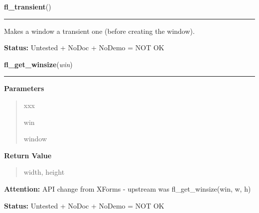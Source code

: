     \label{xformslib:library:fl_transient}

    \vspace{0.5ex}

\hspace{.8\funcindent}\begin{boxedminipage}{\funcwidth}

    \raggedright \textbf{fl\_transient}()

    \vspace{-1.5ex}

    \rule{\textwidth}{0.5\fboxrule}
\setlength{\parskip}{2ex}
    Makes a window a transient one (before creating the window).

\setlength{\parskip}{1ex}
\textbf{Status:} Untested + NoDoc + NoDemo = NOT OK



    \end{boxedminipage}

    \label{xformslib:library:fl_get_winsize}

    \vspace{0.5ex}

\hspace{.8\funcindent}\begin{boxedminipage}{\funcwidth}

    \raggedright \textbf{fl\_get\_winsize}(\textit{win})

    \vspace{-1.5ex}

    \rule{\textwidth}{0.5\fboxrule}
\setlength{\parskip}{2ex}
\setlength{\parskip}{1ex}
      \textbf{Parameters}
      \vspace{-1ex}

      \begin{quote}
        \begin{Ventry}{xxx}

          \item[win]

          window

        \end{Ventry}

      \end{quote}

      \textbf{Return Value}
    \vspace{-1ex}

      \begin{quote}
      width, height

      \end{quote}

\textbf{Attention:} API change from XForms - upstream was fl\_get\_winsize(win, w, h)



\textbf{Status:} Untested + NoDoc + NoDemo = NOT OK



    \end{boxedminipage}


